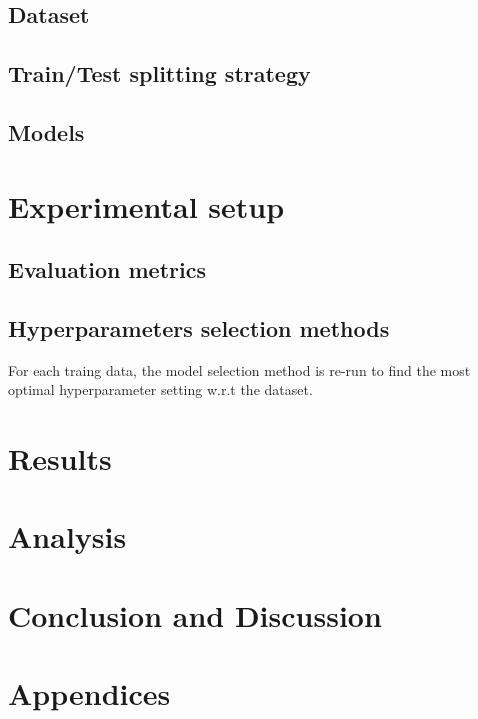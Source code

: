 \documentclass[12pt,a4paper]{article}
\theoremstyle{definition}
\theoremstyle{remark}
\begin{document}
\subsection{Dataset}

\subsection{Train/Test splitting strategy}

\subsection{Models}

\section{Experimental setup}


\subsection{Evaluation metrics}

\subsection{Hyperparameters selection methods}
For each traing data, the model selection method is re-run to find the most optimal hyperparameter setting w.r.t the dataset.


\section{Results}

\section{Analysis}

\section{Conclusion and Discussion}

\newpage

\newpage

\nocite{*}

\appendix
\newpage
\section*{Appendices}
\end{document}
